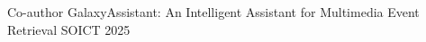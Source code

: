 
\begin{cventries}
  \cventry
    {Co-author}
    {GalaxyAssistant: An Intelligent Assistant for Multimedia Event Retrieval}
    {SOICT}
    {2025}
    {}
\end{cventries}
